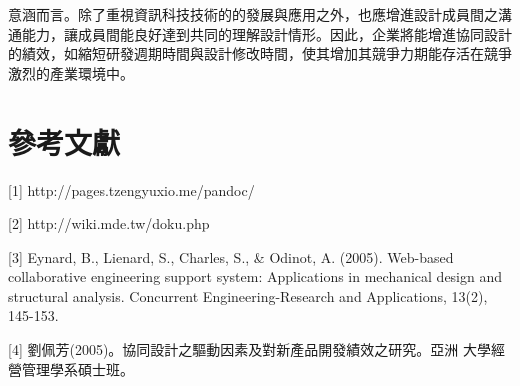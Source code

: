 \documentclass[]{article}
\begin{document}
意涵而言。除了重視資訊科技技術的的發展與應用之外，也應增進設計成員間之溝通能力，讓成員間能良好達到共同的理解設計情形。因此，企業將能增進協同設計的績效，如縮短研發週期時間與設計修改時間，使其增加其競爭力期能存活在競爭激烈的產業環境中。

\section{參考文獻}\label{ux53c3ux8003ux6587ux737b}

{[}1{]} http://pages.tzengyuxio.me/pandoc/

{[}2{]} http://wiki.mde.tw/doku.php

{[}3{]} Eynard, B., Lienard, S., Charles, S., \& Odinot, A. (2005).
Web-based collaborative engineering support system: Applications in
mechanical design and structural analysis. Concurrent
Engineering-Research and Applications, 13(2), 145-153.

{[}4{]} 劉佩芳(2005)。協同設計之驅動因素及對新產品開發績效之研究。亞洲
大學經營管理學系碩士班。
\end{document}
